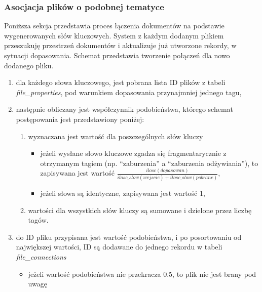 \documentclass[12pt,a4paper,twoside]{article}
\begin{document}
\subsubsection{Asocjacja plików o podobnej tematyce}
Poniższa sekcja przedstawia proces łączenia dokumentów na podstawie wygenerowanych słów kluczowych. System z każdym dodanym plikiem przeszukuję przestrzeń dokumentów i aktualizuje już utworzone rekordy, w sytuacji dopasowania. Schemat przedstawia tworzenie połączeń dla nowo dodanego pliku.
\begin{enumerate}
\item dla każdego słowa kluczowego, jest pobrana lista ID plików z tabeli \textit{file\_properties}, pod warunkiem dopasowania przynajmniej jednego tagu,
\item następnie obliczany jest współczynnik podobieństwa, którego schemat postępowania jest przedstawiony poniżej:
	\begin{enumerate}
		\item wyznaczana jest wartość dla poszczególnych słów kluczy
		\begin{itemize}
			\item jeżeli wysłane słowo kluczowe zgadza się fragmentarycznie z otrzymanym tagiem (np. ``zaburzenia'' a ``zaburzenia odżywiania''), to zapisywana jest wartość $\frac{ilosc(dopasowan)}{ilosc\_slow(wejscie)+ilosc\_slow(pobrane)}$,
			\item jeżeli słowa są identyczne, zapisywana jest wartość 1,
		\end{itemize}
		\item wartości dla wszystkich słów kluczy są sumowane i dzielone przez liczbę tagów.
	\end{enumerate}
\item do ID pliku przypisana jest wartość podobieństwa, i po posortowaniu od największej wartości, ID są dodawane do jednego rekordu w tabeli \textit{file\_connections}
	\begin{itemize}
		\item jeżeli wartość podobieństwa nie przekracza 0.5, to plik nie jest brany pod uwagę
	\end{itemize}
\end{enumerate}
\end{document}
